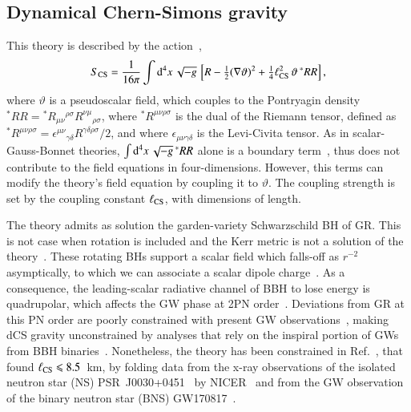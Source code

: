\documentclass[twocolumn,
               prd,
               aps,
               superscriptaddress,
               tightenlines,
               nofootinbib,
               eqsecnum,
               amsfonts,
               amsmath,
               longbibliography]{revtex4-1}
\newcommand{\dV}{{\rm d}^{4}x \, \sqrt{-g} \,}
\begin{document}
\subsection{Dynamical Chern-Simons gravity}
\label{sec:review_dcs}

This theory is described by the action~\cite{Jackiw:2003pm,Alexander:2009tp},
%
\begin{equation} \label{eq:action_dcs}
    S_{\rm CS} = \frac{1}{16 \pi}
    \int \dV
    \left[
    R - \tfrac{1}{2}(\nabla \vartheta)^2
    + \tfrac{1}{4} \ell^{2}_{\rm CS} \, \vartheta \, {}^{*}RR
    \right],
\end{equation}
%
where $\vartheta$ is a pseudoscalar field, which couples to the Pontryagin
density
${}^{*}RR = {}^{*}R_{\mu\nu}{}^{\rho\sigma} R^{\nu\mu}{}_{\rho\sigma}$,
%
where ${}^{*}R^{\mu\nu\rho\sigma}$ is the dual of the Riemann tensor,
defined as
%
${}^{*}R^{\mu\nu\rho\sigma} =
\epsilon^{\mu\nu}{}_{\gamma\delta}
R^{\gamma\delta\rho\sigma} / 2$,
%
and where $\epsilon_{\mu\nu\gamma\delta}$ is the Levi-Civita tensor.
%
As in scalar-Gauss-Bonnet theories, $\int \dV {}^{*}RR$ alone is a boundary
term~\cite{Jackiw:2003pm}, thus does not contribute to the field equations in
four-dimensions.
%
However, this terms can modify the theory's field equation by coupling it to
$\vartheta$.
%
The coupling strength is set by the coupling constant $\ell_{\rm CS}$, with
dimensions of length.

The theory admits as solution the garden-variety Schwarzschild BH of GR. This
is not case when rotation is included and the Kerr metric is not a solution of
the theory~\cite{Jackiw:2003pm}.
%
These rotating BHs support a scalar field which falls-off as
$r^{-2}$ asymptically, to which we can associate a scalar dipole
charge~\cite{Yunes:2009hc,Konno:2009kg}.
%
As a consequence, the leading-scalar radiative channel of BBH to lose energy is quadrupolar,
which affects the GW phase at 2PN order~\cite{Yagi:2011xp,Alexander:2017jmt}.
%
Deviations from GR at this PN order are poorly constrained with present GW
observations~\cite{LIGOScientific:2021sio}, making dCS gravity unconstrained by
analyses that rely on the inspiral portion of GWs from BBH
binaries~\cite{Nair:2019iur,Perkins:2021mhb}.
%
Nonetheless, the theory has been constrained in Ref.~\cite{Silva:2020acr}, that found
%
$\ell_{\rm CS} \leqslant 8.5$~km,
%
by folding data from the x-ray observations of the isolated neutron star (NS)
PSR~J0030+0451~\cite{Lommen:2000yt,NANOGrav:2017wvv} by
NICER~\cite{Riley:2019yda,Miller:2019cac} and from the GW observation of the binary
neutron star (BNS) GW170817~\cite{TheLIGOScientific:2017qsa,LIGOScientific:2018cki}.
\end{document}
